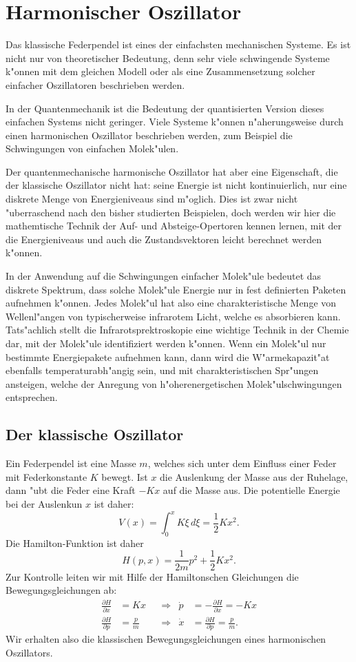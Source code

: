 \chapter{Harmonischer Oszillator\label{chapter:harmonischeroszillator}}
\rhead{}
Das klassische Federpendel ist eines der einfachsten mechanischen 
Systeme. Es ist nicht nur von theoretischer Bedeutung, denn sehr
viele schwingende Systeme k"onnen mit dem gleichen Modell
oder als eine Zusammensetzung solcher einfacher Oszillatoren
beschrieben werden.

In der Quantenmechanik ist die Bedeutung der quantisierten Version
dieses einfachen Systems nicht geringer. Viele Systeme k"onnen
n"aherungsweise durch einen harmonischen Oszillator beschrieben
werden, zum Beispiel die Schwingungen von einfachen Molek"ulen.

Der quantenmechanische harmonische Oszillator hat aber eine Eigenschaft,
die der klassische Oszillator nicht hat: seine Energie ist nicht
kontinuierlich, nur eine diskrete Menge von Energieniveaus sind
m"oglich. Dies ist zwar nicht "uberraschend nach den bisher studierten
Beispielen, doch werden wir hier die mathemtische Technik  der
Auf- und Absteige-Opertoren kennen lernen, mit der die Energieniveaus
und auch die Zustandsvektoren leicht berechnet werden k"onnen.

In der Anwendung auf die Schwingungen einfacher Molek"ule
bedeutet das diskrete Spektrum, dass solche Molek"ule Energie nur in
fest definierten Paketen aufnehmen k"onnen.
Jedes Molek"ul hat also eine charakteristische Menge von Wellenl"angen
von typischerweise infrarotem Licht, welche es absorbieren kann.
Tats"achlich stellt die Infrarotsprektroskopie eine wichtige
Technik in der Chemie dar, mit der Molek"ule identifiziert werden k"onnen.
Wenn ein Molek"ul nur bestimmte Energiepakete aufnehmen kann, dann
wird die W"armekapazit"at ebenfalls temperaturabh"angig sein, und
mit charakteristischen Spr"ungen ansteigen, welche der Anregung
von h"oherenergetischen Molek"ulschwingungen entsprechen.

\section{Der klassische Oszillator}
Ein Federpendel ist eine Masse $m$, welches sich unter dem Einfluss
einer Feder mit Federkonstante $K$ bewegt. Ist $x$ die Auslenkung
der Masse aus der Ruhelage, dann "ubt die Feder eine Kraft $-Kx$ 
auf die Masse aus. Die potentielle Energie bei der Auslenkun
$x$ ist daher:
\[
V(x)=\int_0^xK\xi\,d\xi=\frac12Kx^2.
\]
Die Hamilton-Funktion ist daher
\[
H(p,x)=\frac1{2m}p^2+\frac12Kx^2.
\]
Zur Kontrolle leiten wir mit Hilfe der Hamiltonschen Gleichungen
die Bewegungsgleichungen ab:
\begin{align*}
\frac{\partial H}{\partial x}&=Kx
&
&\Rightarrow&
\dot p&=-\frac{\partial H}{\partial x}=-Kx
\\
\frac{\partial H}{\partial p}&=\frac{p}{m}
&
&\Rightarrow&
\dot x&=\frac{\partial H}{\partial p}=\frac{p}{m}.
\end{align*}
Wir erhalten also die klassischen  Bewegungsgleichungen eines harmonischen
Oszillators. 

